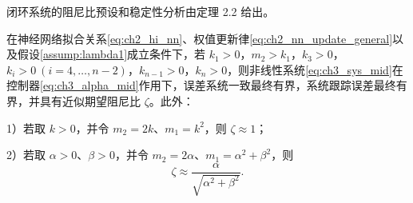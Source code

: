 闭环系统的阻尼比预设和稳定性分析由定理 2.2 给出。
\setcounter{theorem}{1}
\begin{theorem}\label{thm:ch3_theorem22}
在神经网络拟合关系\eqref{eq:ch2_hi_nn}、权值更新律\eqref{eq:ch2_nn_update_general}以及假设\ref{assump:lambda1}成立条件下，若 $k_1>0$，$m_2>k_1$，$k_3>0$，$k_i>0\ (i=4,\ldots,n-2)$，$k_{n-1}>0$，$k_n>0$，则非线性系统\eqref{eq:ch3_sys_mid}在控制器\eqref{eq:ch3_alpha_mid}作用下，误差系统一致最终有界，系统跟踪误差最终有界，并具有近似期望阻尼比 $\zeta$。此外：

1）若取 $k>0$，并令 $m_2=2k$、$m_1=k^2$，则 $\zeta\approx1$；

2）若取 $\alpha>0$、$\beta>0$，并令 $m_2=2\alpha$、$m_1=\alpha^2+\beta^2$，则
\begin{equation}
\zeta\approx\frac{\alpha}{\sqrt{\alpha^2+\beta^2}}.
\end{equation}
\end{theorem}
